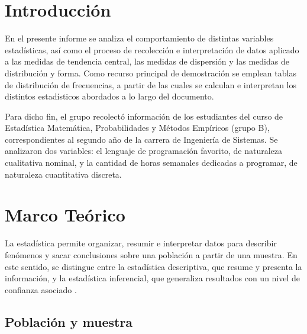 \documentclass[12pt,letterpaper]{article}
\begin{document}
\clearpage
\tableofcontents
\clearpage

\section{Introducción}

En el presente informe se analiza el comportamiento de distintas variables estadísticas, así como el proceso de recolección e interpretación de datos aplicado a las medidas de tendencia central, las medidas de dispersión y las medidas de distribución y forma. Como recurso principal de demostración se emplean tablas de distribución de frecuencias, a partir de las cuales se calculan e interpretan los distintos estadísticos abordados a lo largo del documento.

Para dicho fin, el grupo recolectó información de los estudiantes del curso de Estadística Matemática, Probabilidades y Métodos Empíricos (grupo B), correspondientes al segundo año de la carrera de Ingeniería de Sistemas. Se analizaron dos variables: el lenguaje de programación favorito, de naturaleza cualitativa nominal, y la cantidad de horas semanales dedicadas a programar, de naturaleza cuantitativa discreta. 

\clearpage

\section{Marco Teórico}

La estadística permite organizar, resumir e interpretar datos para describir fenómenos y sacar conclusiones sobre una población a partir de una muestra. En este sentido, se distingue entre la estadística descriptiva, que resume y presenta la información, y la estadística inferencial, que generaliza resultados con un nivel de confianza asociado \parencite{cordova2003}.

\subsection{Población y muestra}
\end{document}
